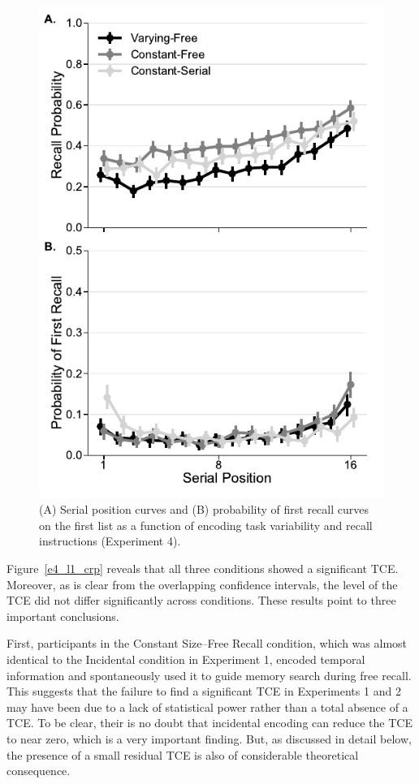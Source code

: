 \documentclass[man,natbib,floatsintext]{apa6} %
\begin{document}
\begin{figure}
\includegraphics{figures/E4_spc_list1.pdf}
\caption{(A) Serial position curves and (B) probability of first recall curves on the first list as a function of encoding task variability and recall instructions (Experiment 4).\spcpaneltext}
\label{e4_l1_spc}
\end{figure}

Figure~\ref{e4_l1_crp} reveals that all three conditions showed a significant TCE. Moreover, as is clear from the overlapping confidence intervals, the level of the TCE did not differ significantly across conditions. These results point to three important conclusions.

First, participants in the Constant Size--Free Recall condition, which was almost identical to the Incidental condition in Experiment 1, encoded temporal information and spontaneously used it to guide memory search during free recall. This suggests that the failure to find a significant TCE in Experiments 1 and 2 may have been due to a lack of statistical power rather than a total absence of a TCE. To be clear, their is no doubt that incidental encoding can reduce the TCE to near zero, which is a very important finding. But, as discussed in detail below, the presence of a small residual TCE is also of considerable theoretical consequence.
\end{document}
